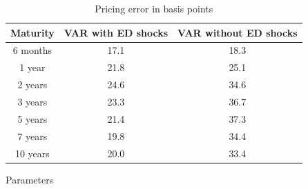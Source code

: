 \documentclass{article}
\numberwithin{equation}{section}
\begin{document}
\begin{table}
\begin{center}
\begin{tabular}{|c|c|c|}
    \hline
    \textbf{Maturity} & \textbf{VAR with ED shocks} & \textbf{VAR without ED
    shocks}\\ \hline
    6 months  & 17.1 & 18.3 \\ \hline
    1 year    & 21.8 & 25.1 \\ \hline
    2 years   & 24.6 & 34.6 \\ \hline
    3 years   & 23.3 & 36.7 \\ \hline
    5 years   & 21.4 & 37.3 \\ \hline
    7 years   & 19.8 & 34.4 \\ \hline
    10 years  & 20.0 & 33.4 \\ \hline
\end{tabular}
\end{center}
\label{tab:2}
\caption{Pricing error in basis points}
\end{table}

Parameters
\end{document}
